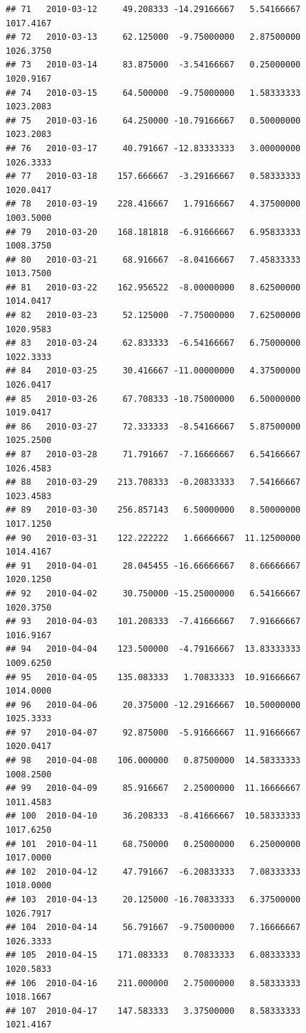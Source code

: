 \documentclass[
]{article}
\begin{document}
\begin{verbatim}
## 71   2010-03-12     49.208333 -14.29166667   5.54166667    1017.4167
## 72   2010-03-13     62.125000  -9.75000000   2.87500000    1026.3750
## 73   2010-03-14     83.875000  -3.54166667   0.25000000    1020.9167
## 74   2010-03-15     64.500000  -9.75000000   1.58333333    1023.2083
## 75   2010-03-16     64.250000 -10.79166667   0.50000000    1023.2083
## 76   2010-03-17     40.791667 -12.83333333   3.00000000    1026.3333
## 77   2010-03-18    157.666667  -3.29166667   0.58333333    1020.0417
## 78   2010-03-19    228.416667   1.79166667   4.37500000    1003.5000
## 79   2010-03-20    168.181818  -6.91666667   6.95833333    1008.3750
## 80   2010-03-21     68.916667  -8.04166667   7.45833333    1013.7500
## 81   2010-03-22    162.956522  -8.00000000   8.62500000    1014.0417
## 82   2010-03-23     52.125000  -7.75000000   7.62500000    1020.9583
## 83   2010-03-24     62.833333  -6.54166667   6.75000000    1022.3333
## 84   2010-03-25     30.416667 -11.00000000   4.37500000    1026.0417
## 85   2010-03-26     67.708333 -10.75000000   6.50000000    1019.0417
## 86   2010-03-27     72.333333  -8.54166667   5.87500000    1025.2500
## 87   2010-03-28     71.791667  -7.16666667   6.54166667    1026.4583
## 88   2010-03-29    213.708333  -0.20833333   7.54166667    1023.4583
## 89   2010-03-30    256.857143   6.50000000   8.50000000    1017.1250
## 90   2010-03-31    122.222222   1.66666667  11.12500000    1014.4167
## 91   2010-04-01     28.045455 -16.66666667   8.66666667    1020.1250
## 92   2010-04-02     30.750000 -15.25000000   6.54166667    1020.3750
## 93   2010-04-03    101.208333  -7.41666667   7.91666667    1016.9167
## 94   2010-04-04    123.500000  -4.79166667  13.83333333    1009.6250
## 95   2010-04-05    135.083333   1.70833333  10.91666667    1014.0000
## 96   2010-04-06     20.375000 -12.29166667  10.50000000    1025.3333
## 97   2010-04-07     92.875000  -5.91666667  11.91666667    1020.0417
## 98   2010-04-08    106.000000   0.87500000  14.58333333    1008.2500
## 99   2010-04-09     85.916667   2.25000000  11.16666667    1011.4583
## 100  2010-04-10     36.208333  -8.41666667  10.58333333    1017.6250
## 101  2010-04-11     68.750000   0.25000000   6.25000000    1017.0000
## 102  2010-04-12     47.791667  -6.20833333   7.08333333    1018.0000
## 103  2010-04-13     20.125000 -16.70833333   6.37500000    1026.7917
## 104  2010-04-14     56.791667  -9.75000000   7.16666667    1026.3333
## 105  2010-04-15    171.083333   0.70833333   6.08333333    1020.5833
## 106  2010-04-16    211.000000   2.75000000   8.58333333    1018.1667
## 107  2010-04-17    147.583333   3.37500000   8.58333333    1021.4167

\end{verbatim}
\end{document}
